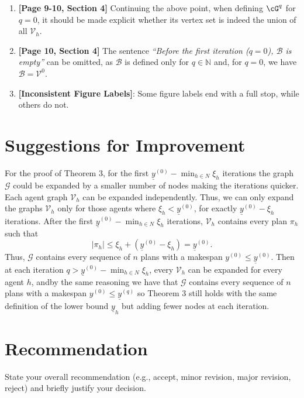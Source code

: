 \documentclass{article}
\begin{document}
\begin{enumerate}
\item \textbf{[Page 9-10, Section 4]}
    Continuing the above point, when defining \(\cG^q\) for \(q=0\), 
    it should be made explicit whether its vertex set is indeed the union of all \(\mathcal{V}_h\). 

\item \textbf{[Page 10, Section 4]} 
    The sentence \emph{“Before the first iteration (\(q=0\)), \(\mathcal{B}\) is empty”} can be omitted, 
    as \(\mathcal{B}\) is defined only for \(q \in \mathbb{N}\) and, for \(q=0\), we  have 
    \(\mathcal{B} = \mathcal{V}^0\). 
    
\item \textbf{[Inconsistent Figure Labels]}: Some figure labels end with a full stop, while others do not.


\end{enumerate}


\section*{Suggestions for Improvement}

For the proof of Theorem 3, for the first \(\underline{y}^{(0)}- \min_{h \in N}\xi_h\) iterations the graph \(\mathcal{G}\) could be expanded by a smaller number of nodes making the iterations quicker.
Each agent graph \(\mathcal{V}_h\) can be expanded independently. Thus, we can only expand the graphs \(\mathcal{V}_h\) only for those agents where \(\xi_h < \underline{y}^{(0)}\), for exactly \( \underline{y}^{(0)} - \xi_h\) iterations.
After the first \(\underline{y}^{(0)}- \min_{h \in N}\xi_h\) iterations, \(\mathcal{V}_h\) contains every plan  \(\pi_h\) such that \[|\pi_h| \leq  \xi_h + (\underline{y}^{(0)}- \xi_h) = \underline{y}^{(0)}.\]
Thus, \(\mathcal{G}\) contains every sequence of \(n\) plans with a makespan \(y^{(0)} \leq \underline{y}^{(0)}\). Then at each iteration \(q > \underline{y}^{(0)} - \min_{h \in N}\xi_h\), every \(\mathcal{V}_h\) can be expanded for every agent \(h\), andby the same reasoning we have 
that \(\mathcal{G}\) contains every sequence of \(n\) plans with a makespan \(y^{(0)} \leq \underline{y}^{(q)}\) so Theorem 3 still holds with the same definition of the lower bound \(\underline{y}_h\) but adding fewer nodes at each iteration.


\section*{Recommendation}

State your overall recommendation (e.g., accept, minor revision, major revision, reject) and briefly justify your decision.
\end{document}
